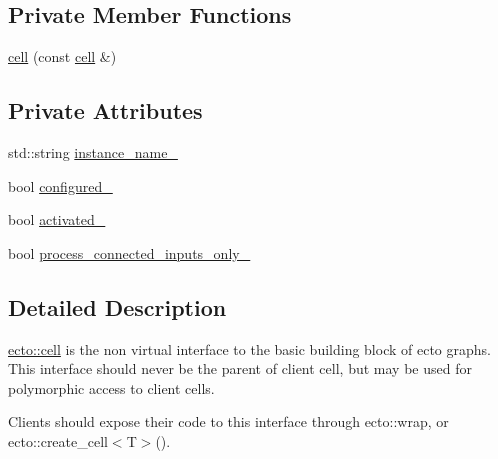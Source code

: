 \subsection*{Private Member Functions}
\begin{DoxyCompactItemize}
\item 
\hyperlink{structecto_1_1cell_ac0ae6a72cecf48916bb6dd1b6393d1b3}{cell} (const \hyperlink{structecto_1_1cell}{cell} \&)
\end{DoxyCompactItemize}
\subsection*{Private Attributes}
\begin{DoxyCompactItemize}
\item 
std\+::string \hyperlink{structecto_1_1cell_a2bf4e65c7a699624c61d3b55cfac45ed}{instance\+\_\+name\+\_\+}
\item 
bool \hyperlink{structecto_1_1cell_a187d36610ae8035e9f589de06ecc0d0a}{configured\+\_\+}
\item 
bool \hyperlink{structecto_1_1cell_ad270620c006f30471b2371feb38b6a03}{activated\+\_\+}
\item 
bool \hyperlink{structecto_1_1cell_a9a9d7fa3bb72fd74073a997bfb6cbad8}{process\+\_\+connected\+\_\+inputs\+\_\+only\+\_\+}
\end{DoxyCompactItemize}


\subsection{Detailed Description}
\hyperlink{structecto_1_1cell}{ecto\+::cell} is the non virtual interface to the basic building block of ecto graphs. This interface should never be the parent of client cell, but may be used for polymorphic access to client cells. 

Clients should expose their code to this interface through ecto\+::wrap, or ecto\+::create\+\_\+cell$<$\+T$>$().


